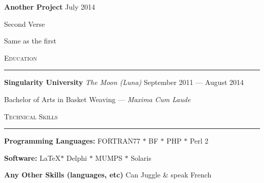 \documentclass[letterpaper]{article}
\begin{document}
\vspace{8pt}


	{\large\textbf{Another Project}} \hfill July 2014\par
\vspace{4pt}

\begin{compactitem}

	\item Second Verse\par

	\item Same as the first\par

\end{compactitem}



\begin{centering}

	{\Large\scshape Education\\[4pt]\hrule\vspace{4pt}}

\end{centering}


{\large\textbf{Singularity University}} {\em The Moon (Luna)} \hfill September 2011 --- August 2014

\begin{compactitem}

	\item Bachelor of Arts in Basket Weaving --- {\em Maxima Cum Laude} \par

\end{compactitem}

\vspace{8pt}



\begin{centering}

	{\Large\scshape Technical Skills\\[4pt]\hrule\vspace{4pt}}

\end{centering}

{\large\textbf {Programming Languages:}} \hfill FORTRAN77 $\ast$ BF $\ast$ PHP $\ast$ Perl 2

{\large\textbf {Software:}} \hfill \LaTeX $\ast$ Delphi $\ast$ MUMPS $\ast$ Solaris

{\large\textbf {Any Other Skills (languages, etc)}} \hfill Can Juggle \&  speak French\par

\vspace{4pt}
\end{document}
